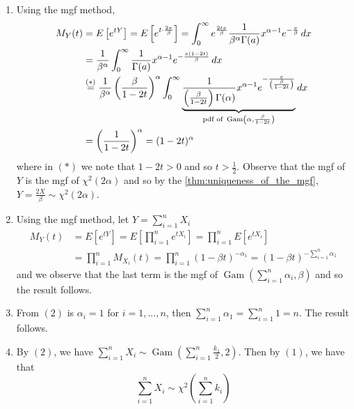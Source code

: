\documentclass[notoc,notitlepage]{tufte-book}
\DeclareMathOperator{\Gam}{Gam }
\begin{document}
\begin{solution}
  \begin{enumerate}
    \item Using the mgf method,
      \begin{align*}
        M_Y(t) &= E\left[ e^{tY} \right] = E\left[ e^{t \cdot \frac{2x}{\beta}} \right] = \int_{0}^{\infty} e^{ \frac{2tx}{\beta} } \frac{1}{\beta^\alpha \Gamma(a)} x^{\alpha - 1} e^{- \frac{x}{\beta}} \dif{x} \\
               &= \frac{1}{\beta^\alpha} \int_{0}^{\infty} \frac{1}{\Gamma(a)} x^{\alpha - 1} e^{ - \frac{x ( 1 - 2t )}{\beta} } \dif{x} \\
               &\overset{(*)}{=} \frac{1}{\beta^\alpha} \left( \frac{\beta}{1 - 2t} \right)^\alpha \int_{0}^{\infty} \underbrace{ \frac{1}{\left( \frac{\beta}{1 - 2t} \right) \Gamma(\alpha)} x^{\alpha - 1} e^{ - \frac{x}{\left( \frac{\beta}{1 - 2t} \right)} } }_{\text{pdf of } \Gam\left(\alpha, \frac{\beta}{1 - 2t}\right)} \dif{x} \\
               &= \left( \frac{1}{1 - 2t} \right)^\alpha = ( 1 - 2t )^\alpha
      \end{align*}
      where in $(*)$ we note that $1 - 2t > 0$ and so $t > \frac{1}{2}$. Observe that the mgf of $Y$ is the mgf of $\chi^2 ( 2 \alpha )$ and so by the \cref{thm:uniqueness_of_the_mgf}, $Y = \frac{2X}{\beta} \sim \chi^2 (2 \alpha)$.
    \item Using the mgf method, let $Y = \sum_{i=1}^{n} X_i$
      \begin{align*}
        M_Y(t) &= E\left[ e^{tY} \right] = E\left[ \prod_{i=1}^{n} e^{tX_i} \right] = \prod_{i=1}^{n} E[ e^{tX_i} ] \\
               &= \prod_{i=1}^{n} M_{X_i}(t) = \prod_{i=1}^{n} ( 1 - \beta t )^{-\alpha_1} = (1 - \beta t)^{- \sum_{i=1}^{n} \alpha_1}
      \end{align*}
      and we observe that the last term is the mgf of $\Gam\left( \sum_{i=1}^{n} \alpha_i, \beta \right)$ and so the result follows.
    \item From $(2)$ is $\alpha_i = 1$ for $i = 1, ..., n$, then $\sum_{i=1}^{n} \alpha_1 = \sum_{i=1}^{n} 1 = n$. The result follows.
    \item By $(2)$, we have $\sum_{i=1}^{n} X_i \sim \Gam\left( \sum_{i=1}^{n} \frac{k_1}{2}, 2 \right)$. Then by $(1)$, we have that
      \begin{equation*}
        \sum_{i=1}^{n} X_i \sim \chi^2\left( \sum_{i=1}^{n} k_i \right)
      \end{equation*}

\end{enumerate}
\end{solution}
\end{document}
